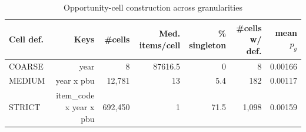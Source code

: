 \begin{table}[htbp]\centering
\caption{Opportunity-cell construction across granularities}
\label{tab:opp_cell_construction}
\begin{tabular}{lrrrrrr}\hline
Cell def. & Keys & \#cells & Med. items/cell & \% singleton & \#cells w/ def. & mean $p_g$ \\\hline
COARSE & year &       8 & 87616.5 & 0 &     8 & 0.00166 \\
MEDIUM & year x pbu &  12,781 & 13 & 5.4 &   182 & 0.00117 \\
STRICT & item\_code x year x pbu & 692,450 & 1 & 71.5 & 1,098 & 0.00159 \\
\hline\end{tabular}\end{table}
